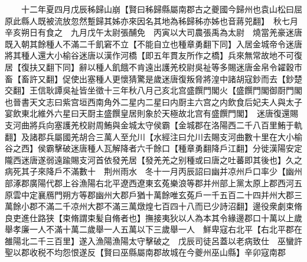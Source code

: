 　　十二年夏四月戊辰秭歸山崩【賢曰秭歸縣屬南郡古之夔國今歸州也袁山松曰屈原此縣人既被流放忽然蹔歸其姊亦來因名其地為秭歸秭亦姊也音蔣兕翻】　秋七月辛亥朔日有食之　九月戊午太尉張酺免　丙寅以大司農張禹為太尉　燒當羌豪迷唐既入朝其餘種人不滿二千飢窘不立【不能自立也種章勇翻下同】入居金城帝令迷唐將其種人還大小榆谷迷唐以漢作河橋【即五年貫友所作之橋】兵來無常故地不可復居【復扶又翻下同】辭以種人飢餓不肯遠出護羌校尉吳祉等多賜迷唐金帛令糴穀市畜【畜許又翻】促使出塞種人更懷猜驚是歲迷唐復叛脅將湟中諸胡寇鈔而去【鈔楚交翻】王信耿譚吳祉皆坐徵十三年秋八月己亥北宫盛饌門閣火【盛饌門閣御㕑門閣也晉書天文志曰紫宫垣西南角外二星内二星曰内㕑主六宫之内飲食后妃夫人與太子宴飲東北維外六星曰天㕑主盛饌皇居則象於天極故北宫有盛饌門閣】　迷唐復還賜支河曲將兵向塞護羌校尉周鮪與金城太守侯霸【金城郡在洛陽西二千八百里鮪于軌翻】及諸郡兵屬國羌胡合三萬人至允川【水經注曰允川去賜支河曲數十里在大小榆谷之西】侯霸擊破迷唐種人瓦解降者六千餘口【種章勇翻降戶江翻】分徙漢陽安定隴西迷唐遂弱遠踰賜支河首依發羌居【發羌羌之别種或曰唐之吐蕃即其後也】久之病死其子來降戶不滿數十　荆州雨水　冬十一月丙辰詔曰幽并凉州戶口率少【幽州部涿郡廣陽代郡上谷漁陽右北平遼西遼東玄菟樂浪等郡并州部上黨太原上郡西河五原雲中定襄鴈門朔方等郡幽州大郡戶猶十萬餘唯玄菟戶一千五百二十四并州大郡三萬餘小郡不滿二千凉州大郡不滿三萬燉煌七百四十八而已少詩沼翻】邊役衆劇束脩良吏進仕路狭【束脩謂束髪自脩者也】撫接夷狄以人為本其令緣邊郡口十萬以上歲舉孝廉一人不滿十萬二歲舉一人五萬以下三歲舉一人　鮮卑寇右北平【右北平郡在雒陽北二千三百里】遂入漁陽漁陽太守擊破之　戊辰司徒呂蓋以老病致仕　巫蠻許聖以郡收税不均怨恨遂反【賢曰巫縣屬南郡故城在今夔州巫山縣】辛卯寇南郡

